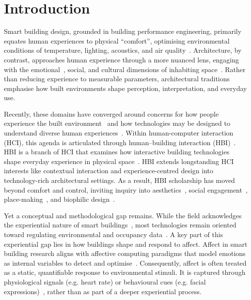 \section{Introduction}
\label{sec:ch3-introduction}
Smart building design, grounded in building performance engineering, primarily equates human experiences to physical ``comfort'', optimising environmental conditions of temperature, lighting, acoustics, and air quality~\cite{alsafery2023sensing, alavi2017comfort, frontczak2011literature}. Architecture, by contrast, approaches human experience through a more nuanced lens, engaging with the emotional~\cite{brady2013sublime}, social, and cultural dimensions of inhabiting space~\cite{pallasmaa2024eyes, kellert2015practice}. Rather than reducing experience to measurable parameters, architectural traditions emphasise how built environments shape perception, interpretation, and everyday use.

Recently, these domains have converged around concerns for how people experience the built environment~\cite{dourish2001action, wiberg2020interaction, kirsh2019architects} and how technologies may be designed to understand diverse human experiences~\cite{wiberg2020interaction, alavi2018artifacts}. Within human-computer interaction (HCI), this agenda is articulated through human–building interaction (HBI)~\cite{alavi2019introduction}. HBI is a branch of HCI that examines how interactive building technologies shape everyday experience in physical space~\cite{alavi2019introduction, alavi2018artifacts, alavi2017comfort}. HBI extends longstanding HCI interests like contextual interaction and experience-centred design into technology-rich architectural settings. As a result, HBI scholarship has moved beyond comfort and control, inviting inquiry into aesthetics~\cite{economidou2021moving}, social engagement~\cite{hoare2015hide}, place-making~\cite{beale2022digital}, and biophilic design~\cite{rao2025designing, rao2025lessons}.

Yet a conceptual and methodological gap remains. While the field acknowledges the experiential nature of smart buildings~\cite{wiberg2020interaction, rao2025smart}, most technologies remain oriented toward regulating environmental and occupancy data~\cite{zhong2020hilo, zeleny2024detection}. A key part of this experiential gap lies in how buildings shape and respond to affect. Affect in smart building research aligns with affective computing paradigms that model emotions as internal variables to detect and optimise~\cite{picard1999affective}. Consequently, affect is often treated as a static, quantifiable response to environmental stimuli. It is captured through physiological signals (e.g. heart rate) or behavioural cues (e.g. facial expressions)~\cite{gao2020n}, rather than as part of a deeper experiential process.  

